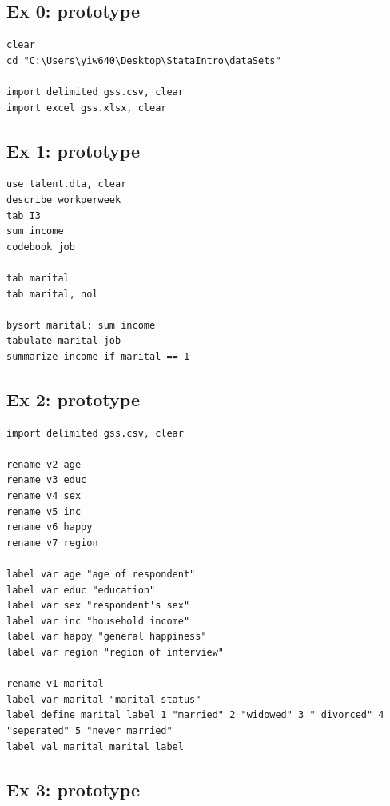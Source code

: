 \documentclass[]{book}
\begin{document}
\hypertarget{ex-0-prototype}{%
\subsection{Ex 0: prototype}\label{ex-0-prototype}}

\begin{verbatim}
clear
cd "C:\Users\yiw640\Desktop\StataIntro\dataSets"

import delimited gss.csv, clear
import excel gss.xlsx, clear
\end{verbatim}

\hypertarget{ex-1-prototype}{%
\subsection{Ex 1: prototype}\label{ex-1-prototype}}

\begin{verbatim}
use talent.dta, clear
describe workperweek
tab I3
sum income
codebook job

tab marital
tab marital, nol

bysort marital: sum income
tabulate marital job
summarize income if marital == 1
\end{verbatim}

\hypertarget{ex-2-prototype}{%
\subsection{Ex 2: prototype}\label{ex-2-prototype}}

\begin{verbatim}
import delimited gss.csv, clear

rename v2 age
rename v3 educ
rename v4 sex
rename v5 inc
rename v6 happy
rename v7 region

label var age "age of respondent"
label var educ "education"
label var sex "respondent's sex"
label var inc "household income"
label var happy "general happiness"
label var region "region of interview"

rename v1 marital
label var marital "marital status"
label define marital_label 1 "married" 2 "widowed" 3 " divorced" 4 "seperated" 5 "never married"
label val marital marital_label
\end{verbatim}

\hypertarget{ex-3-prototype}{%
\subsection{Ex 3: prototype}\label{ex-3-prototype}}
\end{document}
